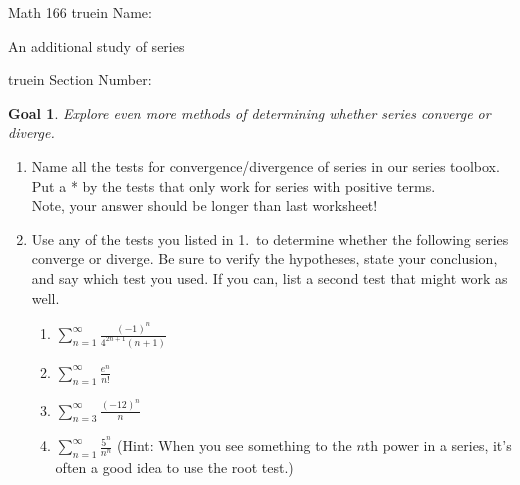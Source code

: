 \documentclass[12pt]{article}
\newtheorem*{goal}{Goal}
\begin{document}
\pagestyle{empty} %

\noindent
{Math 166   truein  Name:\ \hrulefill}

\noindent
{An additional study of series}

\noindent  {} truein  Section Number:\ \hrulefill
\medskip

\begin{goal} \rm
Explore even more methods of determining whether series converge or diverge. 
\end{goal}

\begin{enumerate}
\item Name all the tests for convergence/divergence of series in our series toolbox. Put a * by the tests that only work for series with positive terms.\\ Note, your answer should be longer than last worksheet!
\vfill

\item Use any of the tests you listed in 1.\ to determine whether the following series converge or diverge. Be sure to verify the hypotheses, state your conclusion, and say which test you used. If you can, list a second test that might work as well.
\begin{enumerate}
\item $\displaystyle\sum_{n=1}^\infty \frac{(-1)^n}{4^{2n+1}(n+1)}$

\vfill
\newpage

\item $\displaystyle\sum_{n=1}^{\infty} \frac{e^n}{n!}$

\vfill
\item $\displaystyle\sum_{n=3}^\infty \frac{(-12)^n}{n}$

\vfill

\item $\displaystyle\sum_{n=1}^{\infty} \frac{5^n}{n^n}$ (Hint: When you see something to the $n$th power in a series, it's often a good idea to use the root test.)


\end{enumerate}
\end{enumerate}
\end{document}
